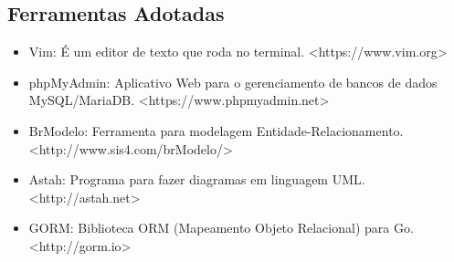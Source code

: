 \documentclass[12pt]{article}
\begin{document}
\subsection{Ferramentas Adotadas}

\begin{itemize}
	\item Vim: É um editor de texto que roda no terminal. <https://www.vim.org>
	\item phpMyAdmin: Aplicativo Web para o gerenciamento de bancos de dados MySQL/MariaDB. <https://www.phpmyadmin.net>
	\item BrModelo: Ferramenta para modelagem Entidade-Relacionamento. <http://www.sis4.com/brModelo/>
	\item Astah: Programa para fazer diagramas em linguagem UML. <http://astah.net>
	\item GORM: Biblioteca ORM (Mapeamento Objeto Relacional) para Go. <http://gorm.io>
\end{itemize}

\newpage
\end{document}
